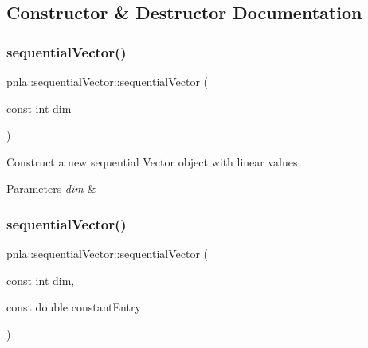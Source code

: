 \subsection{Constructor \& Destructor Documentation}
\mbox{\label{structpnla_1_1sequentialVector_a49041d44d294327ecb7083b1e3aa4ef0}} 
\subsubsection{\texorpdfstring{sequential\+Vector()}{sequentialVector()}\hspace{0.1cm}{\footnotesize\ttfamily [1/3]}}
{\footnotesize\ttfamily pnla\+::sequential\+Vector\+::sequential\+Vector (\begin{DoxyParamCaption}\item[{const int}]{dim }\end{DoxyParamCaption})\hspace{0.3cm}{\ttfamily [inline]}}



Construct a new sequential Vector object with linear values. 


\begin{DoxyParams}{Parameters}
{\em dim} & \\
\hline
\end{DoxyParams}
\mbox{\label{structpnla_1_1sequentialVector_aaced97a869e93a201abe7bb78278f82a}} 
\subsubsection{\texorpdfstring{sequential\+Vector()}{sequentialVector()}\hspace{0.1cm}{\footnotesize\ttfamily [2/3]}}
{\footnotesize\ttfamily pnla\+::sequential\+Vector\+::sequential\+Vector (\begin{DoxyParamCaption}\item[{const int}]{dim,  }\item[{const double}]{constant\+Entry }\end{DoxyParamCaption})\hspace{0.3cm}{\ttfamily [inline]}}



